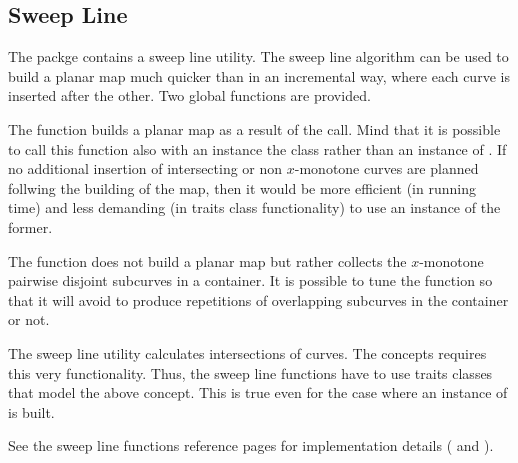 \subsection*{Sweep Line}
  The  packge contains a sweep line
  utility. The sweep line algorithm can be used to build a planar map
  much quicker than in an incremental way, where each curve is
  inserted after the other. Two global functions are provided. 

  The function  builds a planar map
  as a result of the call. Mind that it is possible to call this
  function also with an instance the  class rather
  than an instance of . If no
  additional insertion of intersecting or non $x$-monotone curves are
  planned follwing the building of the map, then it would be more
  efficient (in running time) and less demanding (in traits class
  functionality) to use an instance of the former.

  The function  does not
  build a planar map but rather collects the $x$-monotone pairwise
  disjoint subcurves in a container. It is possible to tune the
  function so that it will avoid to produce repetitions of overlapping
  subcurves in the container or not.

  The sweep line utility calculates intersections of curves.  The
   concepts requires this
  very functionality.  Thus, the sweep line functions have to use
  traits classes that model the above concept. This is true even for
  the case where an instance of  is built.

  See the sweep line functions reference pages for implementation
  details ( and
  ).


